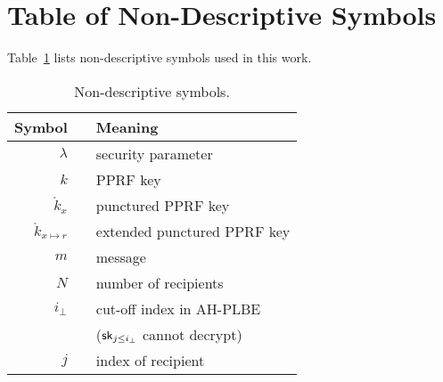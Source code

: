 \section{Table of Non-Descriptive Symbols}

Table~\ref{tab:symbols} lists non-descriptive symbols used in this work.

\begin{table}
\capstart
\centering
\caption{Non-descriptive symbols.}
\label{tab:symbols}
\begin{tabular}{rcl}
\toprule
\hspace*{0.5em}\textbf{Symbol} &\WideNarrow{}{\hspace*{0.5em}}&
\textbf{Meaning}\hspace*{0.5em} \\
\midrule
$\lambda$ && security parameter \\
$k$ && PPRF key \\
$\mathring{k}_x$ && punctured PPRF key \\
$\mathring{k}_{x\mapsto r}$ && extended punctured PPRF key \\
$m$ && message \\
$N$ && number of recipients \\
$i_\bot$ && cut-off index in AH-PLBE \\
&& \quad ($\sk_{j\leq i_\bot}$ cannot decrypt) \\
$j$ && index of recipient \\
\bottomrule
\end{tabular}
\end{table}
